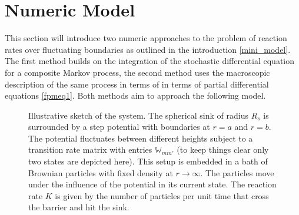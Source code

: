 \chapter{Numeric Model}
\label{numeric_model}
This section will introduce two numeric approaches to the problem of reaction rates over fluctuating boundaries as outlined in the introduction \ref{mini_model}. The first method builds on the integration of the stochastic differential equation for a composite Markov process, the second method uses the macroscopic description of the same process in terms of in terms of partial differential equations \eqref{fpmeq1}. Both methods aim to approach the following model.\\

\begin{minipage}[t]{.5 \textwidth}
    \begin{figure}[H]
 \hspace{-1.8 cm}       
    \end{figure}
\end{minipage}\hspace{0.05 \textwidth}\begin{minipage}[t]{.45\textwidth}
    \begin{figure}[H]
        \caption{Illustrative sketch of the system. The spherical sink of radius $R_s$ is surrounded by a step potential with boundaries at $r=a$ and $r=b$. The potential fluctuates between different heights subject to a transition rate matrix with entries $\mathbb{W}_{mm'}$ (to keep things clear only two states are depicted here). This setup is embedded in a bath of Brownian particles with fixed density at $r \rightarrow \infty$. The particles move under the influence of the potential in its current state. The reaction rate $K$ is given by the number of particles per unit time that cross the barrier and hit the sink.\label{skizze}}
    \end{figure}
\end{minipage}

